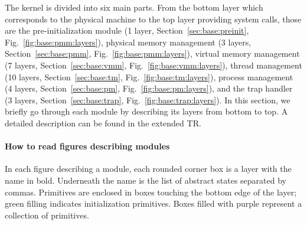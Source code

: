 The \mCTOSbase{} kernel is divided into six main parts.  From the
bottom layer which corresponds to the physical machine to the top
layer providing system calls, those are the pre-initialization module
(1 layer, Section~\ref{sec:base:preinit},
Fig.~\ref{fig:base:pmm:layers}), physical memory management (3 layers,
Section~\ref{sec:base:pmm}, Fig.~\ref{fig:base:pmm:layers}), virtual
memory management (7 layers, Section~\ref{sec:base:vmm},
Fig.~\ref{fig:base:vmm:layers}), thread management (10 layers,
Section~\ref{sec:base:tm}, Fig.~\ref{fig:base:tm:layers}), process
management (4 layers, Section~\ref{sec:base:pm},
Fig.~\ref{fig:base:pm:layers}), and the trap handler (3 layers,
Section~\ref{sec:base:trap}, Fig.~\ref{fig:base:trap:layers}).  In
this section, we briefly go through each module by describing its
layers from bottom to top.  A detailed description can be found in the
extended TR.

\vspace*{-10pt}
\paragraph{How to read figures describing modules}
In each figure describing a module, each rounded corner box is a layer
with the name in bold. Underneath the name is the list of abstract
states separated by commas. Primitives are enclosed in boxes
touching the bottom edge of the layer; green filling indicates
initialization primitives. Boxes filled with purple represent
a collection of primitives.

